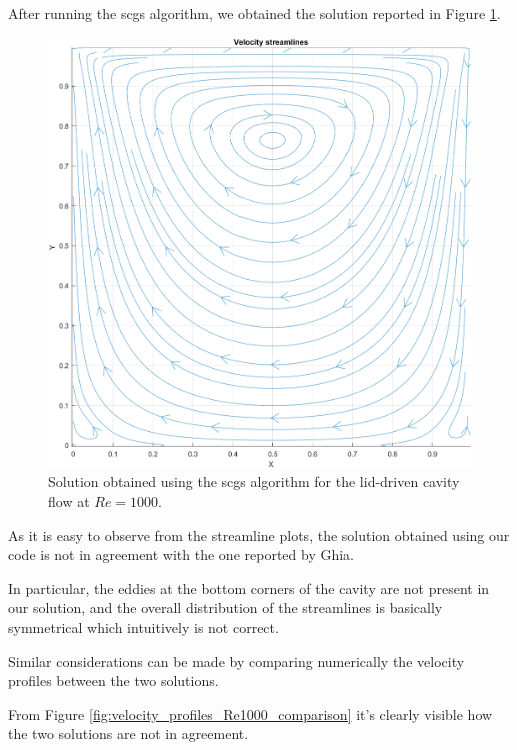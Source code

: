 After running the \acrshort{scgs} algorithm, we obtained the solution reported in Figure \ref{fig:scgs_solution_Re1000}.

\begin{figure}[H]
    \centering
    \includegraphics[width=.6\textwidth]{./img/scgs_solution_Re1000}
    \caption{Solution obtained using the \acrshort{scgs} algorithm for the lid-driven cavity flow at $Re = 1000$.}
    \label{fig:scgs_solution_Re1000}
\end{figure}

As it is easy to observe from the streamline plots, the solution obtained using our code is not in agreement with the one reported by Ghia.

In particular, the eddies at the bottom corners of the cavity are not present in our solution, and the overall distribution of the streamlines is basically symmetrical which intuitively is not correct.

Similar considerations can be made by comparing numerically the velocity profiles between the two solutions.

From Figure \ref{fig:velocity_profiles_Re1000_comparison} it's clearly visible how the two solutions are not in agreement.

